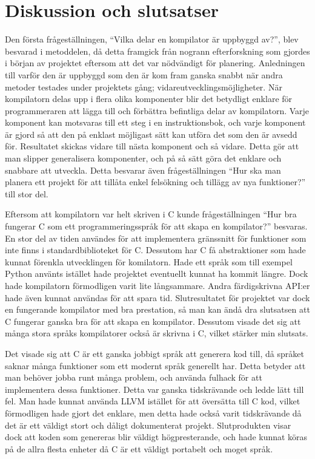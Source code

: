 \documentclass{theme}
\begin{document}
\section{Diskussion och slutsatser}

Den första frågeställningen, ``Vilka delar en kompilator är uppbyggd av?'', blev 
besvarad i metoddelen, då detta framgick från nogrann efterforskning som gjordes
i början av projektet eftersom att det var nödvändigt för planering. Anledningen
till varför den är uppbyggd som den är kom fram ganska snabbt när andra metoder
testades under projektets gång; vidareutvecklingsmöjligheter. När kompilatorn
delas upp i flera olika komponenter blir det betydligt enklare för
programmeraren att lägga till och förbättra befintliga delar av kompilatorn.
Varje komponent kan motsvaras till ett steg i en instruktionsbok, och varje
komponent är gjord så att den på enklast möjligast sätt kan utföra det som den
är avsedd för. Resultatet skickas vidare till nästa komponent och så vidare.
Detta gör att man slipper generalisera komponenter, och på så sätt göra det
enklare och snabbare att utveckla. Detta besvarar även frågeställningen ``Hur 
ska man planera ett projekt för att tillåta enkel felsökning och tillägg av nya 
funktioner?'' till stor del.

Eftersom att kompilatorn var helt skriven i C kunde frågeställningen ``Hur bra
fungerar C som ett programmeringsspråk för att skapa en kompilator?'' besvaras. 
En stor del av tiden användes för att implementera gränssnitt för funktioner som
inte finns i standardbiblioteket för C. Dessutom har C få abstraktioner som hade
kunnat förenkla utvecklingen för komilatorn. Hade ett språk som till exempel 
Python använts istället hade projektet eventuellt kunnat ha kommit längre. Dock
hade kompilatorn förmodligen varit lite långsammare. Andra färdigskrivna API:er
hade även kunnat användas för att spara tid. Slutresultatet för projektet var
dock en fungerande kompilator med bra prestation, så man kan ändå dra slutsatsen
att C fungerar ganska bra för att skapa en kompilator. Dessutom visade det sig
att många stora språks kompilatorer också är skrivna i C, vilket stärker min
slutsats.

Det visade sig att C är ett ganska jobbigt språk att generera kod till, då 
språket saknar många funktioner som ett modernt språk generellt har. Detta 
betyder att man behöver jobba runt många problem, och använda fulhack för att 
implementera dessa funktioner. Detta var ganska tidskrävande och ledde lätt till
fel. Man hade kunnat använda LLVM istället för att översätta till C kod, vilket
förmodligen hade gjort det enklare, men detta hade också varit tidskrävande då
det är ett väldigt stort och dåligt dokumenterat projekt. Slutprodukten visar 
dock att koden som genereras blir väldigt högpresterande, och hade kunnat köras
på de allra flesta enheter då C är ett väldigt portabelt och moget språk. 
\end{document}
